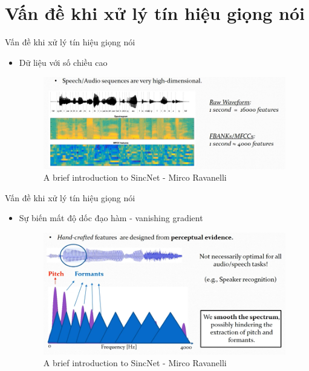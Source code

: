 \documentclass[11pt]{beamer}
\begin{document}
\section{Vấn đề khi xử lý tín hiệu giọng nói}
\begin{frame}{Vấn đề khi xử lý tín hiệu giọng nói}
	\begin{itemize}
		\item Dữ liệu với số chiều cao
		\begin{figure}[H]
			\includegraphics[width=1\linewidth]{images/capture_01.png}
			\caption{A brief introduction to SincNet - Mirco Ravanelli}
			\label{fig:writing-thesis}
		\end{figure}
	\end{itemize}
\end{frame}
\begin{frame}{Vấn đề khi xử lý tín hiệu giọng nói}
	\begin{itemize}
		\item Sự biến mất độ dốc đạo hàm - vanishing gradient
		\begin{figure}[H]
			\includegraphics[width=0.9\linewidth]{images/perceptual_evidence.png}
			\caption{A brief introduction to SincNet - Mirco Ravanelli}
			\label{fig:writing-thesis}
		\end{figure}
	\end{itemize}
\end{frame}
\end{document}
